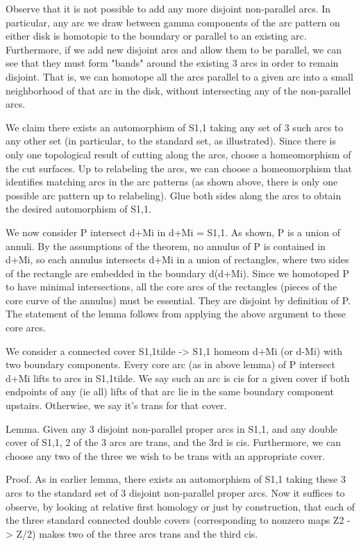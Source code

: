 \documentclass[12pt]{amsart}
\theoremstyle{definition}
\begin{document}
Observe that it is not possible to add any more disjoint non-parallel arcs. In
particular, any arc we draw between gamma components of the arc pattern on
either disk is homotopic to the boundary or parallel to an existing arc.
Furthermore, if we add new disjoint arcs and allow them to be parallel, we can
see that they must form "bands" around the existing 3 arcs in order to remain
disjoint. That is, we can homotope all the arcs parallel to a given arc into
a small neighborhood of that arc in the disk, without intersecting any of the
non-parallel arcs.

We claim there exists an automorphism of S1,1 taking any set of 3 such arcs to
any other set (in particular, to the standard set, as illustrated). Since there
is only one topological result of cutting along the arcs, choose
a homeomorphism of the cut surfaces. Up to relabeling the arcs, we can choose
a homeomorphism that identifies matching arcs in the arc patterns (as shown
above, there is only one possible arc pattern up to relabeling). Glue both
sides along the arcs to obtain the desired automorphism of S1,1.

We now consider P intersect d+Mi in d+Mi = S1,1. As shown, P is a union of
annuli. By the assumptions of the theorem, no annulus of P is contained in
d+Mi, so each annulus intersects d+Mi in a union of rectangles, where two sides
of the rectangle are embedded in the boundary d(d+Mi). Since we homotoped P to
have minimal intersections, all the core arcs of the rectangles (pieces of the
core curve of the annulus) must be essential. They are disjoint by definition
of P. The statement of the lemma follows from applying the above argument to
these core arcs.

We consider a connected cover S1,1tilde -> S1,1 homeom d+Mi (or d-Mi) with two
boundary components. Every core arc (as in above lemma) of P intersect d+Mi
lifts to arcs in S1,1tilde. We say such an arc is cis for a given cover if
both endpoints of any (ie all) lifts of that arc lie in the same boundary
component upstairs. Otherwise, we say it's trans for that cover.

Lemma. Given any 3 disjoint non-parallel proper arcs in S1,1, and any double
cover of S1,1, 2 of the 3 arcs are trans, and the 3rd is cis.
Furthermore, we can choose any two of the three we wish to be trans with an
appropriate cover.

Proof. As in earlier lemma, there exists an automorphism of S1,1
taking these 3 arcs to the standard set of 3 disjoint non-parallel proper arcs.
Now it suffices to observe, by looking at relative first homology or just by
construction, that each of the three standard connected double covers
(corresponding to nonzero maps Z2 -> Z/2) makes two of the three arcs trans and
the third cis.
\end{document}
